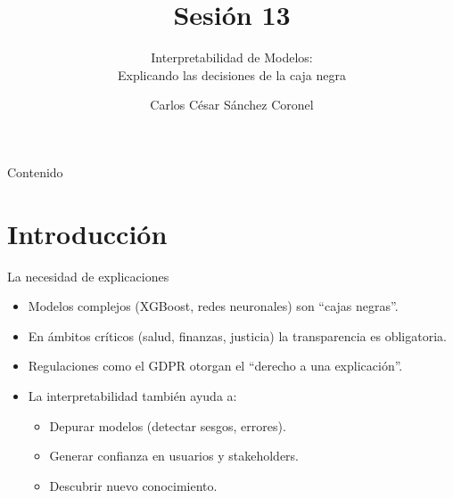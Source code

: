 \documentclass[aspectratio=169, 10pt, xcolor=table]{beamer}
\title[SESIÓN 13]{\textbf{Sesión 13}}
\subtitle{Interpretabilidad de Modelos: \\ Explicando las decisiones de la caja negra}
\author[Prof. C. Sánchez]{Carlos César Sánchez Coronel}
\institute{\textbf{MACHINE LEARNING}}
\date{}
\begin{document}
\begin{frame}
    \titlepage
\end{frame}

\begin{frame}{Contenido}
    \tableofcontents
\end{frame}

\section{Introducción}

\begin{frame}{La necesidad de explicaciones}
    \begin{itemize}
        \item Modelos complejos (XGBoost, redes neuronales) son ``cajas negras''.
        \item En ámbitos críticos (salud, finanzas, justicia) la transparencia es obligatoria.
        \item Regulaciones como el GDPR otorgan el ``derecho a una explicación''.
        \item La interpretabilidad también ayuda a:
        \begin{itemize}
            \item Depurar modelos (detectar sesgos, errores).
            \item Generar confianza en usuarios y stakeholders.
            \item Descubrir nuevo conocimiento.
        \end{itemize}
    \end{itemize}
\end{frame}
\end{document}
